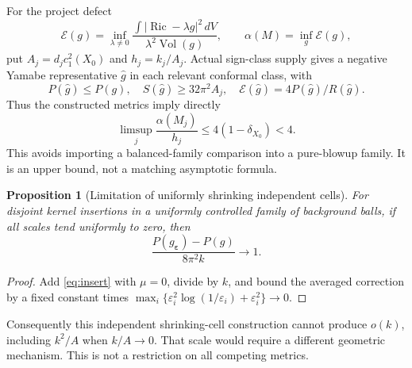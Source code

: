 \documentclass[11pt,a4paper]{article}
\newtheorem{proposition}[theorem]{Proposition}
\theoremstyle{remark}\newtheorem{remark}[theorem]{Remark}
\newcommand{\Ric}{\operatorname{Ric}}
\newcommand{\vol}{\operatorname{Vol}}
\newcommand{\eps}{\varepsilon}
\newcommand{\dd}{\,dV}
\begin{document}
For the project defect
\[
 \mathcal E(g)=\inf_{\lambda\ne0}
 \frac{\int|\Ric-\lambda g|^2\dd}{\lambda^2\vol(g)},\qquad
 \alpha(M)=\inf_g\mathcal E(g),
\]
put $A_j=d_jc_1^2(X_0)$ and $h_j=k_j/A_j$. Actual sign-class supply gives a negative Yamabe representative $\widehat g$ in each relevant conformal class, with
\[
 P(\widehat g)\le P(g),\quad S(\widehat g)\ge32\pi^2A_j,
 \quad\mathcal E(\widehat g)=4P(\widehat g)/R(\widehat g).
\]
Thus the constructed metrics imply directly
\[
 \limsup_j\frac{\alpha(M_j)}{h_j}\le4(1-\delta_{X_0})<4.
\]
This avoids importing a balanced-family comparison into a pure-blowup family. It is an upper bound, not a matching asymptotic formula.

\begin{proposition}[Limitation of uniformly shrinking independent cells]
For disjoint kernel insertions in a uniformly controlled family of background balls, if all scales tend uniformly to zero, then
\[
 \frac{P(g_{\boldsymbol\eps})-P(g)}{8\pi^2k}\longrightarrow1.
\]
\end{proposition}
\begin{proof}
Add \eqref{eq:insert} with $\mu=0$, divide by $k$, and bound the averaged correction by a fixed constant times
$\max_i\{\eps_i^2\log(1/\eps_i)+\eps_i^2\}\to0$.
\end{proof}
Consequently this independent shrinking-cell construction cannot produce $o(k)$, including $k^2/A$ when $k/A\to0$. That scale would require a different geometric mechanism. This is not a restriction on all competing metrics.
\end{document}
